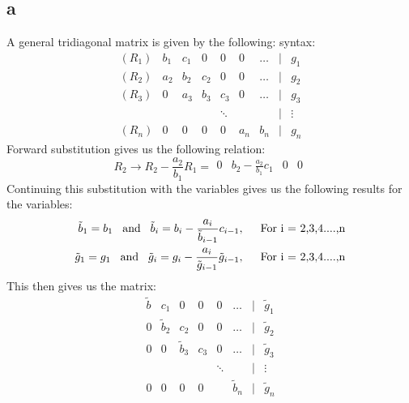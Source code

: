 \documentclass[english,notitlepage]{revtex4-1}  %
\begin{document}
    \subsection*{a}
        \label{sec:6a}
        A general tridiagonal matrix is given by the following: syntax: 
        \begin{equation}
            \begin{matrix}
                (R_1) & b_1 & c_1 & 0 &0 & 0 & \dots & | & g_1
                \\
                (R_2) & a_2 & b_2 & c_2 & 0 & 0 & \dots & | & g_2
                \\
                (R_3) & 0 & a_3 & b_3 & c_3 & 0 & \dots & | & g_3
                \\
                & & & &  \ddots& &  &| & \vdots
                \\
                (R_n) & 0 & 0 & 0 & 0 & a_n & b_n &|& g_n
            \end{matrix}
        \end{equation}
        Forward substitution gives us the following relation: 
        \begin{equation*}
                R_2 \rightarrow R_2 - \frac{a_2}{b_1}R_1 
            =   \begin{matrix}
                    0 & b_2 - \frac{a_2}{b_1}c_1 & 0 & 0
                \end{matrix}
        \end{equation*}
        Continuing this substitution with the variables gives us the following results for the variables:
        \begin{align*}
                \tilde{b}_1 
            =   b_1
            \hspace{3mm}\text{and}\hspace{3mm}
                \tilde{b}_i 
            =   b_i - \frac{a_i}{\tilde{b}_{i-1}}c_{i-1}, 
            \hspace{5mm}\text{For i = 2,3,4....,n}\\
                \tilde{g}_1 
            =   g_1
            \hspace{3mm}\text{and}\hspace{3mm}
                \tilde{g}_i 
            =   g_i - \frac{a_i}{\tilde{g}_{i-1}}\tilde{g}_{i-1}, 
            \hspace{5mm}\text{For i = 2,3,4....,n}
        \end{align*}
        This then gives us the matrix:
        \begin{equation*}
            \begin{matrix}
            \tilde{b} & c_1 & 0 & 0 & 0 & \dots & | & \tilde{g}_1
            \\
            0 & \tilde{b}_2 & c_2 & 0 & 0 & \dots & | & \tilde{g}_2
            \\
            0 & 0 & \tilde{b}_3 & c_3 & 0 & \dots & | & \tilde{g}_3
            \\
            & & & &  \ddots&   &| & \vdots
            \\
            0 & 0 & 0 & 0 &  & \tilde{b}_n &|& \tilde{g}_n
            \end{matrix}
        \end{equation*}
\end{document}
